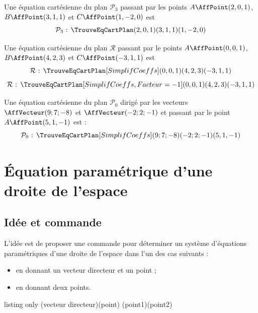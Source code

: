 \documentclass[a4paper,french,11pt]{article}
\newcommand\cmaj[1]{%
	{\tcbox[vignetteMaJ]{#1}\xspace}%
}
\begin{document}
\begin{PresCodePL}{}
Une équation cartésienne du plan $\mathcal{P}_3$ passant par les points $A\AffPoint(2,0,1)$, $B\AffPoint(3,1,1)$ et $C\AffPoint(1,-2,0)$ est
\[ \mathcal{P}_3 \text{ : } \TrouveEqCartPlan(2,0,1)(3,1,1)(1,-2,0)\]
\end{PresCodePL}



\begin{PresCodePL}{}
Une équation cartésienne du plan $\mathcal{R}$ passant par le points $A\AffPoint(0,0,1)$, $B\AffPoint(4,2,3)$ et $C\AffPoint(-3,1,1)$ est
\[ \mathcal{R} \text{ : } \TrouveEqCartPlan[SimplifCoeffs](0,0,1)(4,2,3)(-3,1,1)\]
\[ \mathcal{R} \text{ : } \TrouveEqCartPlan[SimplifCoeffs,Facteur=-1](0,0,1)(4,2,3)(-3,1,1)\]
\end{PresCodePL}

\begin{PresCodePL}{}
Une équation cartésienne du plan $\mathcal{P}_0$ dirigé par les vecteurs $\AffVecteur(9;7;-8)$ et $\AffVecteur(-2;2;-1)$ et passant par le point $A\AffPoint(5,1,-1)$ est :
\[ \mathcal{P}_0 \text{ : } \TrouveEqCartPlan[SimplifCoeffs](9;7;-8)(-2;2;-1)(5,1,-1)\]
\end{PresCodePL}

\newpage

\section{Équation paramétrique d'une droite de l'espace}\label{eqparamdroite}

\subsection{Idée et commande}

\begin{tipblock}
\cmaj{2.6.4} L'idée est de proposer une commande pour déterminer un système d'équations paramétriques d'une droite de l'espace dans l'un des cas suivants :

\begin{itemize}
	\item en donnant un vecteur directeur et un point ;
	\item en donnant deux points.
\end{itemize}
\vspace*{-\baselineskip}\leavevmode
\end{tipblock}

\begin{PresCodeTexPL}{listing only}
\TrouveEqParamDroite[clés](vecteur directeur)(point)
\TrouveEqParamDroite[clés](point1)(point2)
\end{PresCodeTexPL}
\end{document}
